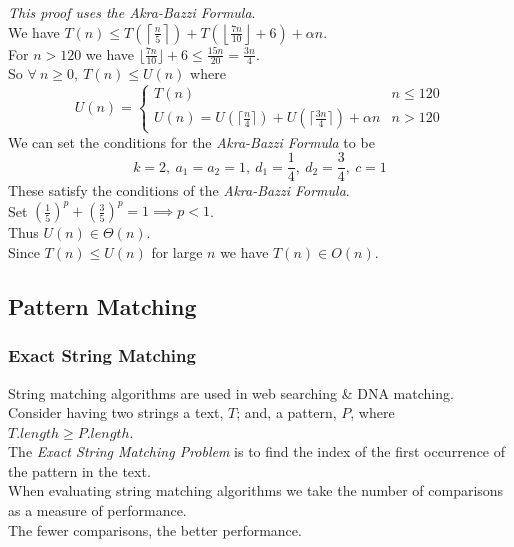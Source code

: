 \documentclass[11pt,a4paper]{article}
\begin{document}
\textit{This proof uses the Akra-Bazzi Formula}.\\
We have $T(n)\leq T\left(\left\lceil\frac{n}{5}\right\rceil\right)+T\left(\left\lfloor\frac{7n}{10}\right\rfloor+6\right)+\alpha n$.\\
For $n>120$ we have $\lfloor\frac{7n}{10}\rfloor+6\leq\frac{15n}{20}=\frac{3n}{4}$.\\
So $\forall\ n\geq0,\ T(n)\leq U(n)$ where\\
$$U(n)=\begin{cases} T(n) & n\leq120\\ U(n)=U(\lceil\frac{n}{4}\rceil)+U(\lceil\frac{3n}{4}\rceil)+\alpha n & n>120\end{cases}$$
We can set the conditions for the \textit{Akra-Bazzi Formula} to be
$$k=2,\ a_1=a_2=1,\ d_1=\frac{1}{4},\ d_2=\frac{3}{4},\ c=1$$
These satisfy the conditions of the \textit{Akra-Bazzi Formula}.\\
Set $(\frac{1}{5})^p+(\frac{3}{5})^p=1 \implies p<1$.\\
Thus $U(n)\in\Theta(n)$.\\
Since $T(n)\leq U(n)$ for large $n$ we have $T(n)\in O(n)$.

\subsection{Pattern Matching}

\subsubsection{Exact String Matching}

String matching algorithms are used in web searching \& DNA matching.\\

Consider having two strings a text, $T$; and, a pattern, $P$, where $T.length\geq P.length$.\\
The \textit{Exact String Matching Problem} is to find the index of the first occurrence of the pattern in the text.\\

\newpage
{}
When evaluating string matching algorithms we take the number of comparisons as a measure of performance.\\
The fewer comparisons, the better performance.\\
\end{document}

